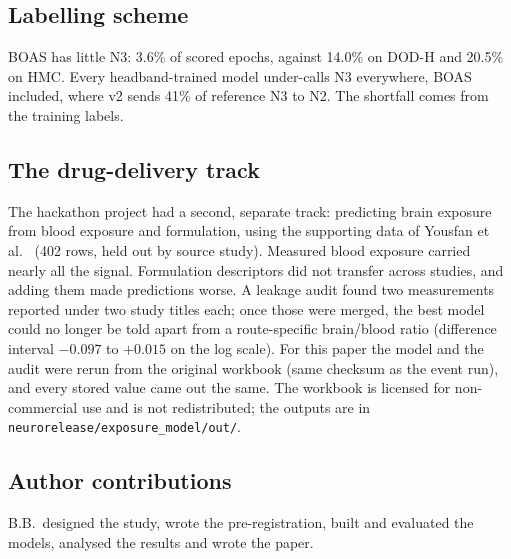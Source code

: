 \documentclass[10pt,twocolumn]{article}
\begin{document}
\subsection{Labelling scheme}
BOAS has little N3: 3.6\% of scored epochs, against 14.0\% on DOD-H and 20.5\% on HMC. Every
headband-trained model under-calls N3 everywhere, BOAS included, where v2 sends 41\% of reference N3 to
N2. The shortfall comes from the training labels.

\subsection{The drug-delivery track}
The hackathon project had a second, separate track: predicting brain exposure from blood exposure and
formulation, using the supporting data of Yousfan et al.\ \cite{yousfan2024} (402 rows, held out by
source study). Measured blood exposure carried nearly all the signal. Formulation descriptors did not
transfer across studies, and adding them made predictions worse. A leakage audit found two measurements
reported under two study titles each; once those were merged, the best model could no longer be told
apart from a route-specific brain/blood ratio (difference interval $-0.097$ to $+0.015$ on the log
scale). For this paper the model and the audit were rerun from the original workbook (same checksum as
the event run), and every stored value came out the same. The workbook is licensed for non-commercial
use and is not redistributed; the outputs are in \texttt{neurorelease/exposure\_model/out/}.

\subsection{Author contributions}
B.B.\ designed the study, wrote the pre-registration, built and evaluated the models, analysed the
results and wrote the paper.
\end{document}
